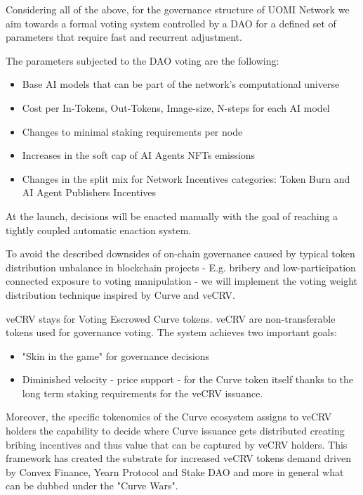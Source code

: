 \documentclass{article}
\begin{document}
Considering all of the above, for the governance structure of UOMI Network we aim towards a formal voting system controlled by a DAO for a defined set of parameters that require fast and recurrent adjustment.

The parameters subjected to the DAO voting are the following:

\begin{itemize}

\item Base AI models that can be part of the network's computational universe

\item Cost per In-Tokens, Out-Tokens, Image-size, N-steps for each AI model

\item Changes to minimal staking requirements per node

\item Increases in the soft cap of AI Agents NFTs emissions

\item Changes in the split mix for Network Incentives categories: Token Burn and AI Agent Publishers Incentives

\end{itemize}

At the launch, decisions will be enacted manually with the goal of reaching a tightly coupled automatic enaction system.

To avoid the described downsides of on-chain governance caused by typical token distribution unbalance in blockchain projects - E.g. bribery and low-participation connected exposure to voting manipulation - we will implement the voting weight distribution technique inspired by Curve and veCRV. 

veCRV stays for Voting Escrowed Curve tokens. veCRV are non-transferable tokens used for governance voting. The system achieves two important goals:

\begin{itemize}

\item "Skin in the game" for governance decisions
\item Diminished velocity - price support - for the Curve token itself thanks to the long term staking requirements for the veCRV issuance. 

\end{itemize}

Moreover, the specific tokenomics of the Curve ecosystem assigns to veCRV holders the capability to decide where Curve issuance gets distributed creating bribing incentives and thus value that can be captured by veCRV holders. This framework has created the substrate for increased veCRV tokens demand driven by Convex Finance, Yearn Protocol and Stake DAO and more in general what can be dubbed under the "Curve Wars". 
\end{document}
